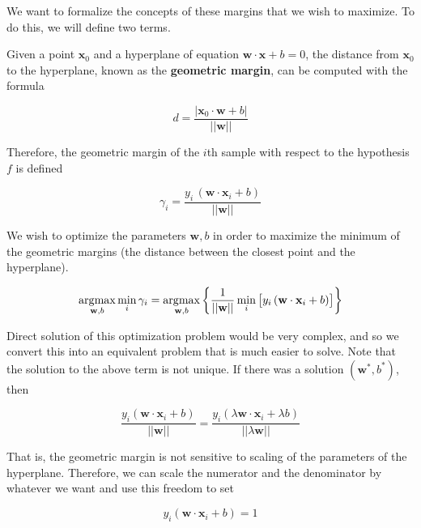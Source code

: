   We want to formalize the concepts of these margins that we wish to maximize. To do this, we will define two terms. 

  \begin{definition}
    Given a point $\mathbf{x}_0$ and a hyperplane of equation $\mathbf{w} \cdot \mathbf{x} + b = 0$, the distance from $\mathbf{x}_0$ to the hyperplane, known as the \textbf{geometric margin}, can be computed with the formula 

    \begin{equation}
      d = \frac{|\mathbf{x}_0 \cdot \mathbf{w} + b|}{||\mathbf{w}||}  
    \end{equation} 

    Therefore, the geometric margin of the $i$th sample with respect to the hypothesis $f$ is defined 

    \begin{equation}
      \gamma_i = \frac{y_i \, (\mathbf{w} \cdot \mathbf{x}_i + b)}{||\mathbf{w}||} 
    \end{equation} 
  \end{definition}

  We wish to optimize the parameters $\mathbf{w}, b$ in order to maximize the minimum of the geometric margins (the distance between the closest point and the hyperplane). 

  \begin{equation}
    \argmax_{\mathbf{w}, b} \min_i \gamma_i = \argmax_{\mathbf{w}, b} \bigg\{ \frac{1}{||\mathbf{w}||} \min_i \big[y_i \, (\mathbf{w} \cdot \mathbf{x}_i + b) \big] \bigg\}
  \end{equation}

  Direct solution of this optimization problem would be very complex, and so we convert this into an equivalent problem that is much easier to solve. Note that the solution to the above term is not unique. If there was a solution $(\mathbf{w}^\ast, b^\ast)$, then 

  \begin{equation}
    \frac{y_i (\mathbf{w} \cdot \mathbf{x}_i + b)}{||\mathbf{w}||} = \frac{y_i (\lambda \mathbf{w} \cdot \mathbf{x}_i + \lambda b)}{||\lambda \mathbf{w}||}  
  \end{equation}

  That is, the geometric margin is not sensitive to scaling of the parameters of the hyperplane. Therefore, we can scale the numerator and the denominator by whatever we want and use this freedom to set 

  \begin{equation*}
    y_i ( \mathbf{w} \cdot \mathbf{x}_i + b ) = 1 
  \end{equation*}
  
